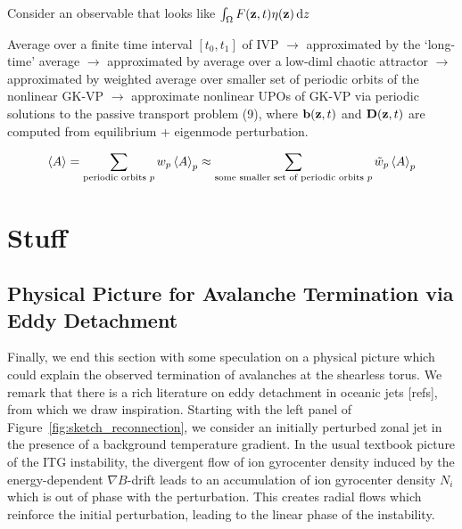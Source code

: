 \documentclass[]{article}
\begin{document}
Consider an observable that looks like \(\int_\Omega F(\vb{z}, t) \eta(\vb{z}) \dd{z}\)

Average over a finite time interval \([t_0, t_1]\) of IVP \(\rightarrow\) approximated by the `long-time' average \(\rightarrow\) approximated by average over a low-diml chaotic attractor \(\rightarrow\) approximated by weighted average over smaller set of periodic orbits of the nonlinear GK-VP \(\rightarrow\) approximate nonlinear UPOs of GK-VP via periodic solutions to the passive transport problem (9), where \(\vb{b}(\vb{z},t)\) and \(\vb{D}(\vb{z},t)\) are computed from equilibrium + eigenmode perturbation.

\begin{equation*}
	\ev{A} = \sum_{\text{periodic orbits } p} w_p \ev{A}_p \approx \sum_{\text{some smaller set of periodic orbits } p} \tilde{w}_p \ev{A}_p
\end{equation*}

\section{Stuff}


\subsection{Physical Picture for Avalanche Termination via Eddy Detachment}


Finally, we end this section with some speculation on a physical picture which could explain the observed termination of avalanches at the shearless torus.
We remark that there is a rich literature on eddy detachment in oceanic jets [refs], from which we draw inspiration.
Starting with the left panel of Figure~\ref{fig:sketch_reconnection}, we consider an initially perturbed zonal jet in the presence of a background temperature gradient.
In the usual textbook picture of the ITG instability, the divergent flow of ion gyrocenter density induced by the energy-dependent \(\nabla B\)-drift leads to an accumulation of ion gyrocenter density \(N_i\) which is out of phase with the perturbation.
This creates radial flows which reinforce the initial perturbation, leading to the linear phase of the instability.
\end{document}
